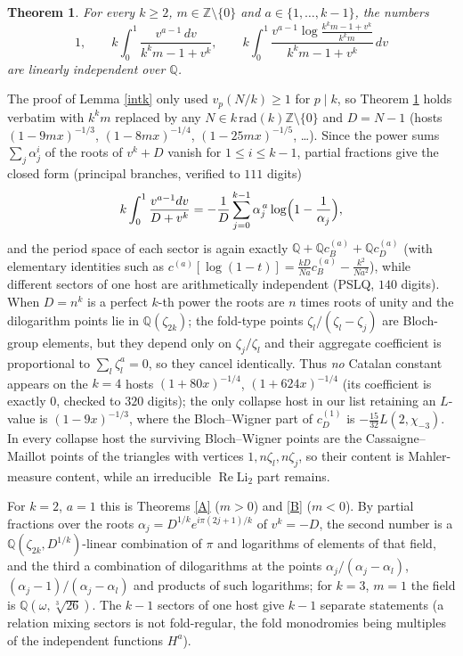 \documentclass[11pt]{amsart}
\newtheorem{theorem}{Theorem}[section]
\theoremstyle{remark}
\newcommand{\Q}{\mathbb Q}\newcommand{\Z}{\mathbb Z}\newcommand{\R}{\mathbb R}\newcommand{\C}{\mathbb C}
\begin{document}
\begin{theorem}\label{D}
For every $k\ge2$, $m\in\Z\setminus\{0\}$ and $a\in\{1,\dots,k-1\}$, the numbers
\[
1,\qquad k\int_0^1\frac{v^{a-1}\,dv}{k^km-1+v^k},\qquad k\int_0^1\frac{v^{a-1}\log\frac{k^km-1+v^k}{k^km}}{k^km-1+v^k}\,dv
\]
are linearly independent over $\Q$.
\end{theorem}

The proof of Lemma \ref{intk} only used $v_p(N/k)\ge1$ for $p\mid k$, so Theorem \ref{D} holds verbatim with $k^km$ replaced by any $N\in k\,\mathrm{rad}(k)\Z\setminus\{0\}$ and $D=N-1$ (hosts $(1-9mx)^{-1/3}$, $(1-8mx)^{-1/4}$, $(1-25mx)^{-1/5}$, \dots). Since the power sums $\sum_j\alpha_j^i$ of the roots of $v^k+D$ vanish for $1\le i\le k-1$, partial fractions give the closed form (principal branches, verified to $111$ digits)
\[
k\int_0^1\frac{v^{a-1}dv}{D+v^k}=-\frac1D\sum_{j=0}^{k-1}\alpha_j^{\,a}\log\Bigl(1-\frac1{\alpha_j}\Bigr),
\]
and the period space of each sector is again exactly $\Q+\Q c_B^{(a)}+\Q c_D^{(a)}$ (with elementary identities such as $c^{(a)}[\log(1-t)]=\frac{kD}{Na}c_B^{(a)}-\frac{k^2}{Na^2}$), while different sectors of one host are arithmetically independent (PSLQ, $140$ digits). When $D=n^k$ is a perfect $k$-th power the roots are $n$ times roots of unity and the dilogarithm points lie in $\Q(\zeta_{2k})$; the fold-type points $\zeta_l/(\zeta_l-\zeta_j)$ are Bloch-group elements, but they depend only on $\zeta_j/\zeta_l$ and their aggregate coefficient is proportional to $\sum_l\zeta_l^a=0$, so they cancel identically. Thus \emph{no} Catalan constant appears on the $k=4$ hosts $(1+80x)^{-1/4}$, $(1+624x)^{-1/4}$ (its coefficient is exactly $0$, checked to $320$ digits); the only collapse host in our list retaining an $L$-value is $(1-9x)^{-1/3}$, where the Bloch--Wigner part of $c_D^{(1)}$ is $-\frac{15}{32}L(2,\chi_{-3})$. In every collapse host the surviving Bloch--Wigner points are the Cassaigne--Maillot points of the triangles with vertices $1,n\zeta_l,n\zeta_j$, so their content is Mahler-measure content, while an irreducible $\operatorname{Re}\mathrm{Li}_2$ part remains.

For $k=2$, $a=1$ this is Theorems \ref{A} ($m>0$) and \ref{B} ($m<0$). By partial fractions over the roots $\alpha_j=D^{1/k}e^{i\pi(2j+1)/k}$ of $v^k=-D$, the second number is a $\Q(\zeta_{2k},D^{1/k})$-linear combination of $\pi$ and logarithms of elements of that field, and the third a combination of dilogarithms at the points $\alpha_j/(\alpha_j-\alpha_l)$, $(\alpha_j-1)/(\alpha_j-\alpha_l)$ and products of such logarithms; for $k=3$, $m=1$ the field is $\Q(\omega,\sqrt[3]{26})$. The $k-1$ sectors of one host give $k-1$ separate statements (a relation mixing sectors is not fold-regular, the fold monodromies being multiples of the independent functions $H^a$).
\end{document}
